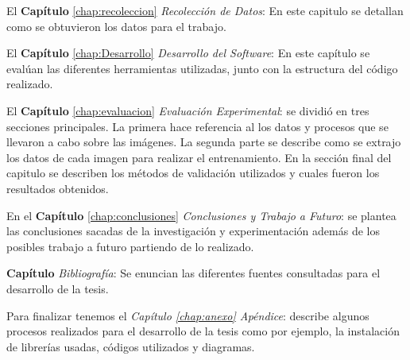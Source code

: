 El \textbf{Capítulo} \ref{chap:recoleccion} \textit{Recolección de Datos}: En este capitulo se detallan como se obtuvieron los datos para el trabajo.

El \textbf{Capítulo} \ref{chap:Desarrollo} \textit{Desarrollo del Software}: En este capítulo se evalúan las diferentes herramientas utilizadas, junto con la estructura del código realizado.

El \textbf{Capítulo} \ref{chap:evaluacion} \textit{Evaluación Experimental}:  se  dividió en tres secciones principales. La primera hace referencia al los datos y procesos que se llevaron a cabo sobre las imágenes. La segunda parte se describe como se extrajo los datos de cada imagen para realizar el entrenamiento. En la sección final del capitulo se describen los métodos de validación utilizados y cuales fueron los resultados obtenidos.

En el \textbf{Capítulo} \ref{chap:conclusiones} \textit{Conclusiones y Trabajo a Futuro}: se plantea las conclusiones sacadas de la investigación y experimentación además de los posibles trabajo a futuro partiendo de lo realizado.

\textbf{Capítulo} \textit{Bibliografía}: Se enuncian las diferentes fuentes consultadas para el desarrollo de la tesis.

Para finalizar tenemos el \textit{Capítulo \ref{chap:anexo} Apéndice}: describe algunos procesos realizados para el desarrollo de la tesis como por ejemplo, la instalación de librerías usadas, códigos utilizados y diagramas.
